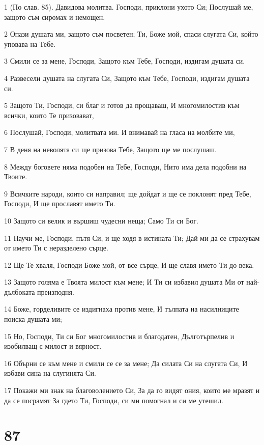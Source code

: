 \par 1 (По слав. 85). Давидова молитва. Господи, приклони ухото Си; Послушай ме, защото съм сиромах и немощен.
\par 2 Опази душата ми, защото съм посветен; Ти, Боже мой, спаси слугата Си, който уповава на Тебе.
\par 3 Смили се за мене, Господи, Защото към Тебе, Господи, издигам душата си.
\par 4 Развесели душата на слугата Си, Защото към Тебе, Господи, издигам душата си.
\par 5 Защото Ти, Господи, си благ и готов да прощаваш, И многомилостив към всички, които Те призовават,
\par 6 Послушай, Господи, молитвата ми. И внимавай на гласа на молбите ми,
\par 7 В деня на неволята си ще призова Тебе, Защото ще ме послушаш.
\par 8 Между боговете няма подобен на Тебе, Господи, Нито има дела подобни на Твоите.
\par 9 Всичките народи, които си направил; ще дойдат и ще се поклонят пред Тебе, Господи, И ще прославят името Ти.
\par 10 Защото си велик и вършиш чудесни неща; Само Ти си Бог.
\par 11 Научи ме, Господи, пътя Си, и ще ходя в истината Ти; Дай ми да се страхувам от името Ти с неразделено сърце.
\par 12 Ще Те хваля, Господи Боже мой, от все сърце, И ще славя името Ти до века.
\par 13 Защото голяма е Твоята милост към мене; И Ти си избавил душата Ми от най-дълбоката преизподня.
\par 14 Боже, горделивите се издигнаха против мене, И тълпата на насилниците поиска душата ми;
\par 15 Но, Господи, Ти си Бог многомилостив и благодатен, Дълготърпелив и изобилващ с милост и вярност.
\par 16 Обърни се към мене и смили се се за мене; Да силата Си на слугата Си, И избави сина на слугинята Си.
\par 17 Покажи ми знак на благоволението Си, За да го видят ония, които ме мразят и да се посрамят За гдето Ти, Господи, си ми помогнал и си ме утешил.

\chapter{87}

